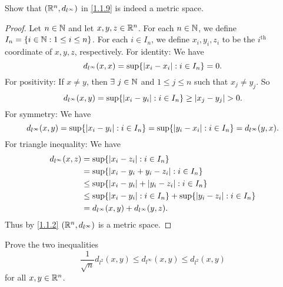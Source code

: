 \begin{ex}\label{ex:1.1.9}
  Show that \((\mathbb{R}^n, d_{l^\infty})\) in \cref{1.1.9} is indeed a metric space.
\end{ex}

\begin{proof}
  Let \(n \in \mathbb{N}\) and let \(x, y, z \in \mathbb{R}^n\).
  For each \(n \in \mathbb{N}\), we define \(I_n = \{i \in \mathbb{N} : 1 \leq i \leq n\}\).
  For each \(i \in I_n\), we define \(x_i, y_i, z_i\) to be the \(i^{\text{th}}\) coordinate of \(x, y, z\), respectively.
  For identity:
  We have
  \[
    d_{l^\infty}(x, x) = \sup \{\left\lvert x_i - x_i\right\rvert : i \in I_n\} = 0.
  \]
  For positivity:
  If \(x \neq y\), then \(\exists\ j \in \mathbb{N}\) and \(1 \leq j \leq n\) such that \(x_j \neq y_j\).
  So
  \[
    d_{l^\infty}(x, y) = \sup \{\left\lvert x_i - y_i\right\rvert : i \in I_n\} \geq \left\lvert x_j - y_j\right\rvert > 0.
  \]
  For symmetry:
  We have
  \[
    d_{l^\infty}(x, y) = \sup \{\left\lvert x_i - y_i\right\rvert : i \in I_n\} = \sup \{\left\lvert y_i - x_i\right\rvert : i \in I_n\} = d_{l^\infty}(y, x).
  \]
  For triangle inequality:
  We have
  \begin{align*}
    d_{l^\infty}(x, z) & = \sup \{\left\lvert x_i - z_i\right\rvert : i \in I_n\}                                           \\
                       & = \sup \{\left\lvert x_i - y_i + y_i - z_i\right\rvert : i \in I_n\}                               \\
                       & \leq \sup \{\left\lvert x_i - y_i\right\rvert + \left\lvert y_i - z_i\right\rvert : i \in I_n\}                      \\
                       & \leq \sup \{\left\lvert x_i - y_i\right\rvert : i \in I_n\} + \sup \{\left\lvert y_i - z_i\right\rvert : i \in I_n\} \\
                       & = d_{l^\infty}(x, y) + d_{l^\infty}(y, z).
  \end{align*}
  Thus by \cref{1.1.2} \((\mathbb{R}^n, d_{l^\infty})\) is a metric space.
\end{proof}

\begin{ex}\label{ex:1.1.10}
  Prove the two inequalities
  \[
    \dfrac{1}{\sqrt{n}} d_{l^2}(x, y) \leq d_{l^\infty}(x, y) \leq d_{l^2}(x, y)
  \]
  for all \(x, y \in \mathbb{R}^n\).
\end{ex}

